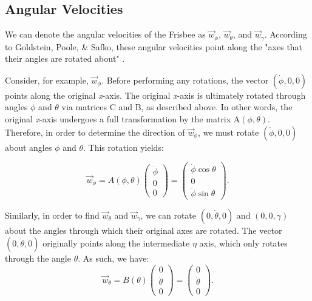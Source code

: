 \documentclass[a4paper,12pt, oneside]{article}
\begin{document}
\subsection{Angular Velocities}

We can denote the angular velocities of the Frisbee as $\vec{w}_\phi$, $\vec{w}_\theta$, and $\vec{w}_\gamma$.  According to Goldstein, Poole, \& Safko, these angular velocities point along the "axes that their angles are rotated about" \cite{gps}.

Consider, for example, $\vec{w}_\phi$.  Before performing any rotations, the vector $(\dot\phi, 0, 0)$ points along the original \textit{x}-axis.  The original \textit{x}-axis is ultimately rotated through angles $\phi$ and $\theta$ via matrices C and B, as described above. In other words, the original \textit{x}-axis undergoes a full transformation by the matrix A$(\phi,\theta)$. Therefore, in order to determine the direction of $\vec{w}_\phi$, we must rotate $(\dot\phi, 0, 0)$ about angles $\phi$ and $\theta$.  This rotation yields:

\begin{equation*}
\vec{w}_\phi=A(\phi,\theta)\left(\begin{array}{ccc}\dot\phi\\0\\0\end{array} \right)=\left(\begin{array}{ccc}\dot\phi\cos\theta\\0\\\dot\phi\sin\theta\end{array} \right).
\end{equation*}

Similarly, in order to find $\vec{w}_\theta$ and $\vec{w}_\gamma$, we can rotate $(0, \dot\theta, 0)$ and $(0, 0, \dot\gamma)$ about the angles through which their original axes are rotated. The vector $(0, \dot\theta, 0)$ originally points along the intermediate $\eta$ axis, which only rotates through the angle $\theta$. As such, we have:
\begin{equation*}
  \vec{w}_\theta=B(\theta)\left(\begin{array}{ccc}
    0\\
    \dot\theta \\
    0
  \end{array} 
  \right)=\left(\begin{array}{ccc}
    0 \\ 
    \dot\theta \\
    0
  \end{array}\right).
\end{equation*}
\end{document}
